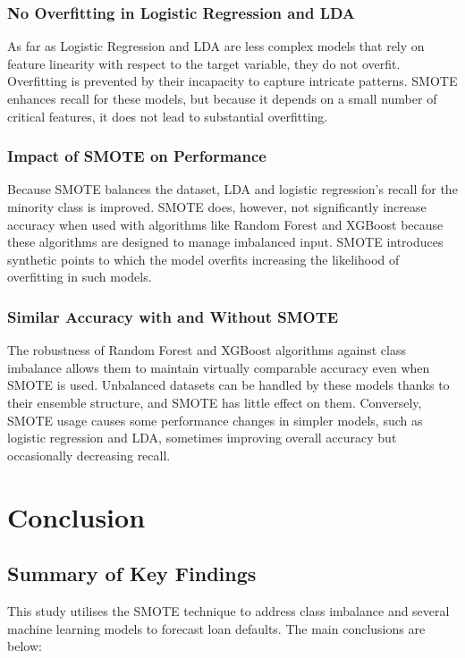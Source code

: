 \documentclass[12pt, a4paper,oneside]{book}
\numberwithin{equation}{section}
\begin{document}
\subsection{No Overfitting in Logistic Regression and LDA}
As far as Logistic Regression and LDA are less complex models that rely on feature linearity with respect to the target variable, they do not overfit. Overfitting is prevented by their incapacity to capture intricate patterns. SMOTE enhances recall for these models, but because it depends on a small number of critical features, it does not lead to substantial overfitting.

\subsection{Impact of SMOTE on Performance}
Because SMOTE balances the dataset, LDA and logistic regression's recall for the minority class is improved. SMOTE does, however, not significantly increase accuracy when used with algorithms like Random Forest and XGBoost because these algorithms are designed to manage imbalanced input. SMOTE introduces synthetic points to which the model overfits increasing the likelihood of overfitting in such models.

\subsection{Similar Accuracy with and Without SMOTE}
The robustness of Random Forest and XGBoost algorithms against class imbalance allows them to maintain virtually comparable accuracy even when SMOTE is used. Unbalanced datasets can be handled by these models thanks to their ensemble structure, and SMOTE has little effect on them. Conversely, SMOTE usage causes some performance changes in simpler models, such as logistic regression and LDA, sometimes improving overall accuracy but occasionally decreasing recall.

\newpage
\chapter{Conclusion}
\section{Summary of Key Findings}
This study utilises the SMOTE technique to address class imbalance and several machine learning models to forecast loan defaults. The main conclusions are below:
\end{document}
